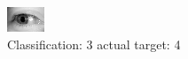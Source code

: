 \begin{figure}[h!]
\begin{center}
\includegraphics[width=0.60\columnwidth]{figures/ID3245_class_3_target_4.png}
\end{center}
\caption{ Classification: 3 actual target: 4}
\label{fig:ID3245_class_3_target_4}
\end{figure}
